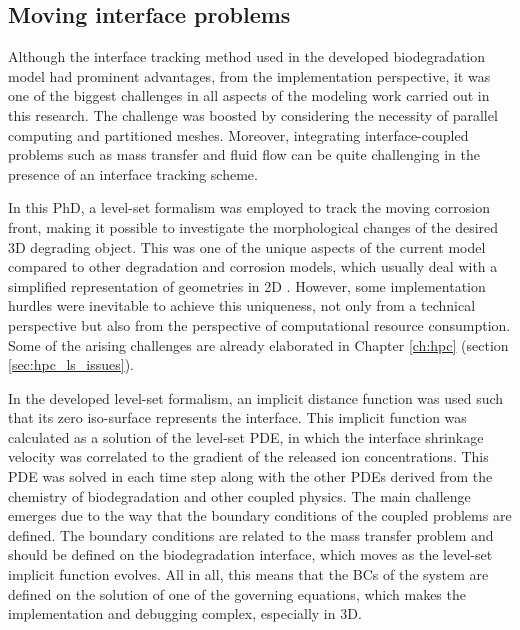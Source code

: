 \subsection{Moving interface problems}

Although the interface tracking method used in the developed biodegradation model had prominent advantages, from the implementation perspective, it was one of the biggest challenges in all aspects of the modeling work carried out in this research. The challenge was boosted by considering the necessity of parallel computing and partitioned meshes. Moreover, integrating interface-coupled problems such as mass transfer and fluid flow can be quite challenging in the presence of an interface tracking scheme.

In this PhD, a level-set formalism was employed to track the moving corrosion front, making it possible to investigate the morphological changes of the desired 3D degrading object. This was one of the unique aspects of the current model compared to other degradation and corrosion models, which usually deal with a simplified representation of geometries in 2D \cite{Albaraghtheh2022}. However, some implementation hurdles were inevitable to achieve this uniqueness, not only from a technical perspective but also from the perspective of computational resource consumption. Some of the arising challenges are already elaborated in Chapter \ref{ch:hpc} (section \ref{sec:hpc_ls_issues}).


In the developed level-set formalism, an implicit distance function was used such that its zero iso-surface represents the interface. This implicit function was calculated as a solution of the level-set \gls{PDE}, in which the interface shrinkage velocity was correlated to the gradient of the released ion concentrations. This \gls{PDE} was solved in each time step along with the other \gls{PDE}s derived from the chemistry of biodegradation and other coupled physics. The main challenge emerges due to the way that the boundary conditions of the coupled problems are defined. The boundary conditions are related to the mass transfer problem and should be defined on the biodegradation interface, which moves as the level-set implicit function evolves. All in all, this means that the \gls{BC}s of the system are defined on the solution of one of the governing equations, which makes the implementation and debugging complex, especially in 3D.

